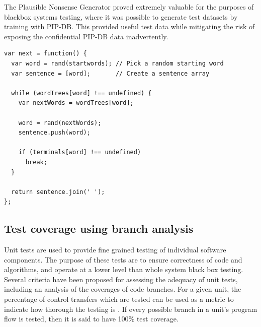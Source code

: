 The Plausible Nonsense Generator proved extremely valuable for the
purposes of blackbox systems testing, where it was possible to
generate test datasets by training with PIP-DB. This provided useful
test data while mitigating the risk of exposing the confidential
PIP-DB data inadvertently.

\br{}


\lstset{language=JavaScript}
\begin{lstlisting}[label=lst:markov-text-generator,caption={%
      [Markov text generator]
      Markov text generator implementation.}]
var next = function() {
  var word = rand(startwords); // Pick a random starting word
  var sentence = [word];       // Create a sentence array

  while (wordTrees[word] !== undefined) {
    var nextWords = wordTrees[word];

    word = rand(nextWords);
    sentence.push(word);

    if (terminals[word] !== undefined)
      break;
  }

  return sentence.join(' ');
};
\end{lstlisting}

\newpage
\subsection{Test coverage using branch analysis}\label{subsec:branch-analysis}

Unit tests are used to provide fine grained testing of individual
software components. The purpose of these tests are to ensure
correctness of code and algorithms, and operate at a lower level than
whole system black box testing. Several criteria have been proposed
for assessing the adequacy of unit tests, including an analysis of the
coverages of code branches. For a given unit, the percentage of
control transfers which are tested can be used as a metric to indicate
how thorough the testing is \cite{zhu1997software}. If every possible
branch in a unit's program flow is tested, then it is said to have
100\% test coverage.

